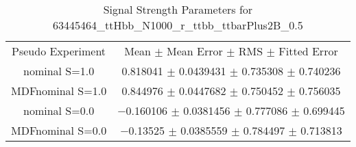 \begin{table}
\centering
\caption{Signal Strength Parameters for 63445464\_ttHbb\_N1000\_r\_ttbb\_ttbarPlus2B\_0.5}
\begin{tabular}{cc}
\toprule
Pseudo Experiment & Mean $\pm$ Mean Error $\pm$ RMS $\pm$ Fitted Error\\
nominal S=1.0 & \num{0.818041} $\pm$ \num{0.0439431} $\pm$ \num{0.735308} $\pm$ \num{0.740236}\\
MDFnominal S=1.0 & \num{0.844976} $\pm$ \num{0.0447682} $\pm$ \num{0.750452} $\pm$ \num{0.756035}\\
nominal S=0.0 & \num{-0.160106} $\pm$ \num{0.0381456} $\pm$ \num{0.777086} $\pm$ \num{0.699445}\\
MDFnominal S=0.0 & \num{-0.13525} $\pm$ \num{0.0385559} $\pm$ \num{0.784497} $\pm$ \num{0.713813}\\
\bottomrule
\end{tabular}
\end{table}